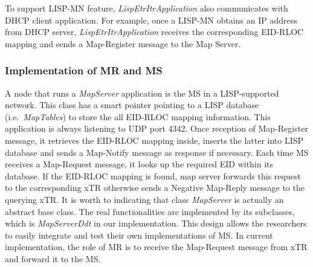 To support LISP-MN feature, \emph{LispEtrItrApplication} also communicates with DHCP client application. For example, once a LISP-MN obtains an IP address from DHCP server, \emph{LispEtrItrApplication} receives the corresponding EID-RLOC mapping and sends a Map-Register message to the Map Server.

\subsubsection{Implementation of MR and MS}
A node that runs a \emph{MapServer} application is the MS in a LISP-supported network. This class has a smart pointer pointing to a LISP database (i.e.~\emph{MapTables}) to store the all EID-RLOC mapping information. This application is always listening to UDP port 4342. Once reception of Map-Register message, it retrieves the EID-RLOC mapping inside, inserts the latter into LISP database and sends a Map-Notify message as response if necessary. %
Each time MS receives a Map-Request message, it looks up the required EID within its database. If the EID-RLOC mapping is found, map server forwards this request to the corresponding xTR otherwise sends a Negative Map-Reply message to the querying xTR. It is worth to indicating that class \emph{MapServer} is actually an abstract base class. The real functionalities are implemented by its subclasses, which is \emph{MapServerDdt} in our implementation. This design allows the researchers to easily integrate and test their own implementations of MS. In current implementation, the role of MR is to receive the Map-Request message from xTR and forward it to the MS.

